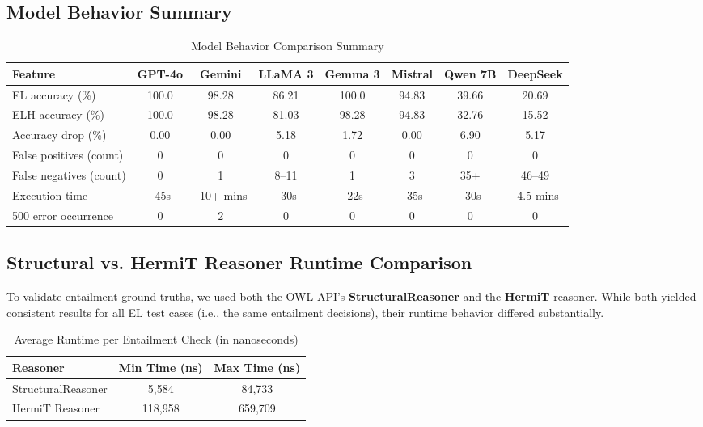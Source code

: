 \documentclass[11pt]{article}
\begin{document}
\subsection{Model Behavior Summary}
\begin{table}[H]
\scriptsize
\centering
\caption{Model Behavior Comparison Summary}
\label{tab:behavior}
\begin{tabular}{|l|c|c|c|c|c|c|c|}
\hline
\textbf{Feature} & \textbf{GPT-4o} & \textbf{Gemini} & \textbf{LLaMA 3} & \textbf{Gemma 3} & \textbf{Mistral} & \textbf{Qwen 7B} & \textbf{DeepSeek} \\
\hline
EL accuracy (\%) & 100.0 & 98.28 & 86.21 & 100.0 & 94.83 & 39.66 & 20.69 \\
ELH accuracy (\%) & 100.0 & 98.28 & 81.03 & 98.28 & 94.83 & 32.76 & 15.52 \\
Accuracy drop (\%) & 0.00 & 0.00 & 5.18 & 1.72 & 0.00 & 6.90 & 5.17 \\
False positives (count) & 0 & 0 & 0 & 0 & 0 & 0 & 0 \\
False negatives (count) & 0 & 1 & 8–11 & 1 & 3 & 35+ & 46–49 \\
Execution time & ~45s & ~10+ mins & ~30s & ~22s & ~35s & ~30s & ~4.5 mins \\
500 error occurrence & 0 & 2 & 0 & 0 & 0 & 0 & 0 \\
\hline
\end{tabular}
\end{table}


\subsection{Structural vs. HermiT Reasoner Runtime Comparison}

To validate entailment ground-truths, we used both the OWL API's \textbf{StructuralReasoner} and the \textbf{HermiT} reasoner. While both yielded consistent results for all EL test cases (i.e., the same entailment decisions), their runtime behavior differed substantially.

\begin{table}[h!]
\centering
\caption{Average Runtime per Entailment Check (in nanoseconds)}
\label{tab:reasoner-runtime}
\begin{tabular}{|l|c|c|}
\hline
\textbf{Reasoner} & \textbf{Min Time (ns)} & \textbf{Max Time (ns)} \\
\hline
StructuralReasoner & 5,584 & 84,733 \\
HermiT Reasoner & 118,958 & 659,709 \\
\hline
\end{tabular}
\end{table}
\end{document}
